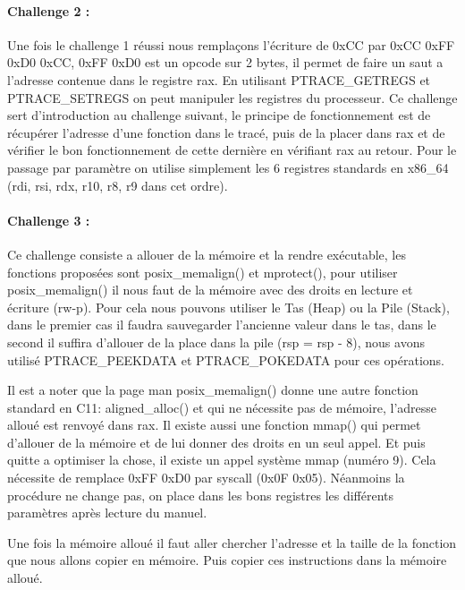 \documentclass[12pt]{article}
\begin{document}
\newpage

\paragraph{Challenge 2 :}

Une fois le challenge 1 réussi nous remplaçons l'écriture de 0xCC par 0xCC 0xFF 0xD0 0xCC, 0xFF 0xD0 est un opcode sur 2 bytes,
il permet de faire un saut a l'adresse contenue dans le registre rax.
En utilisant PTRACE\_GETREGS et PTRACE\_SETREGS on peut manipuler les registres du processeur.
Ce challenge sert d'introduction au challenge suivant, le principe de fonctionnement est de récupérer l'adresse d'une fonction dans le tracé,
puis de la placer dans rax et de vérifier le bon fonctionnement de cette dernière en vérifiant rax au retour.
Pour le passage par paramètre on utilise simplement les 6 registres standards en x86\_64 (rdi, rsi, rdx, r10, r8, r9 dans cet ordre). 


\paragraph{Challenge 3 :}

Ce challenge consiste a allouer de la mémoire et la rendre exécutable, les fonctions proposées sont posix\_memalign()
et mprotect(), pour utiliser posix\_memalign() il nous faut de la mémoire avec des droits en lecture et écriture (rw-p).
Pour cela nous pouvons utiliser le Tas (Heap) ou la Pile (Stack), dans le premier cas il faudra sauvegarder l'ancienne valeur dans le tas,
dans le second il suffira d'allouer de la place dans la pile (rsp = rsp - 8), nous avons utilisé PTRACE\_PEEKDATA et
PTRACE\_POKEDATA pour ces opérations.

Il est a noter que la page man posix\_memalign() donne une autre fonction standard en C11: aligned\_alloc() et qui ne nécessite pas de mémoire, l'adresse alloué est renvoyé dans rax.
Il existe aussi une fonction mmap() qui permet d'allouer de la mémoire et de lui donner des droits en un seul appel.
Et puis quitte a optimiser la chose, il existe un appel système mmap (numéro 9).
Cela nécessite de remplace 0xFF 0xD0 par syscall (0x0F 0x05).
Néanmoins la procédure ne change pas, on place dans les bons registres les différents paramètres après lecture du manuel.

Une fois la mémoire alloué il faut aller chercher l'adresse et la taille de la fonction que nous allons copier en mémoire.
Puis copier ces instructions dans la mémoire alloué.
\end{document}
